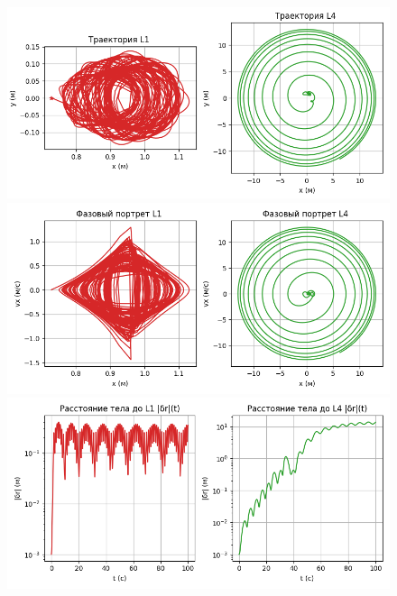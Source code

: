 \documentclass[12pt]{article}
\begin{document}
\begin{figure}[H]
  \centering
  \includegraphics[width=1\textwidth]{Figure_11.png}
  \includegraphics[width=1\textwidth]{Figure_22.png}
  \includegraphics[width=1\textwidth]{Figure_33.png}
\end{figure}
\end{document}
